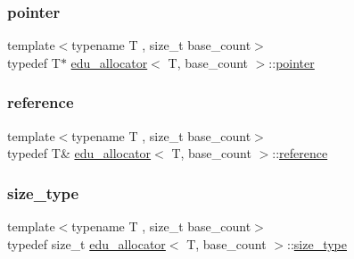 \mbox{\label{classedu__allocator_a735857fd1d42cae69aef990a62e597cf}} 
\subsubsection{\texorpdfstring{pointer}{pointer}}
{\footnotesize\ttfamily template$<$typename T , size\+\_\+t base\+\_\+count$>$ \\
typedef T$\ast$ \hyperlink{classedu__allocator}{edu\+\_\+allocator}$<$ T, base\+\_\+count $>$\+::\hyperlink{classedu__allocator_a735857fd1d42cae69aef990a62e597cf}{pointer}}

\mbox{\label{classedu__allocator_ad2c2e48954832a74ab522ad2093dfaba}} 
\subsubsection{\texorpdfstring{reference}{reference}}
{\footnotesize\ttfamily template$<$typename T , size\+\_\+t base\+\_\+count$>$ \\
typedef T\& \hyperlink{classedu__allocator}{edu\+\_\+allocator}$<$ T, base\+\_\+count $>$\+::\hyperlink{classedu__allocator_ad2c2e48954832a74ab522ad2093dfaba}{reference}}

\mbox{\label{classedu__allocator_aa140c3e2a9364dcbc207fa148b5c1deb}} 
\subsubsection{\texorpdfstring{size\+\_\+type}{size\_type}}
{\footnotesize\ttfamily template$<$typename T , size\+\_\+t base\+\_\+count$>$ \\
typedef size\+\_\+t \hyperlink{classedu__allocator}{edu\+\_\+allocator}$<$ T, base\+\_\+count $>$\+::\hyperlink{classedu__allocator_aa140c3e2a9364dcbc207fa148b5c1deb}{size\+\_\+type}}

\mbox{\label{classedu__allocator_ac2a6b2105b188c027d63daa51068f991}} 
